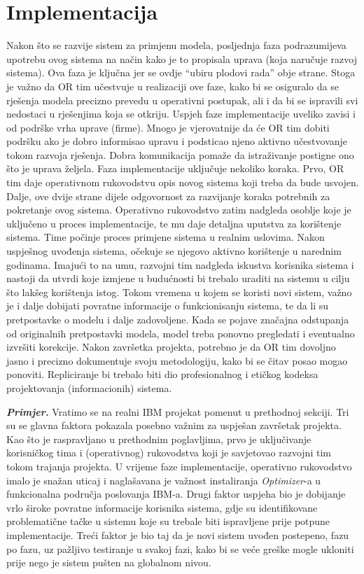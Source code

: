\documentclass[a4paper, utf8, 11pt, colorlinks]{book}
\begin{document}
\section{Implementacija}
Nakon što se razvije sistem za primjenu modela, posljednja faza  podrazumijeva upotrebu ovog sistema  na način kako je to propisala uprava (koja naručuje razvoj sistema). Ova faza je ključna jer se ovdje ``ubiru plodovi rada'' obje strane. Stoga je važno da OR tim  učestvuje u  realizaciji ove faze, kako bi se osiguralo da se rješenja modela precizno prevedu u operativni postupak, ali i da bi se ispravili svi nedostaci u rješenjima koja se otkriju. Uspjeh faze implementacije uveliko zavisi i od podrške vrha uprave (firme). Mnogo je vjerovatnije da će OR tim dobiti podršku ako je dobro informisao upravu i podsticao  njeno aktivno učestvovanje tokom razvoja rješenja. Dobra komunikacija pomaže da istraživanje postigne ono što je uprava željela.  Faza implementacije uključuje nekoliko koraka. Prvo, OR tim daje operativnom rukovodstvu opis novog sistema koji treba da bude usvojen. Dalje, ove dvije strane dijele odgovornost za razvijanje koraka potrebnih za pokretanje ovog sistema. Operativno rukovodstvo zatim nadgleda  osoblje koje je uključeno u proces implementacije, te mu daje detaljna uputstva za korištenje sistema. Time počinje proces primjene sistema u realnim uslovima. Nakon uspješnog uvođenja sistema, očekuje se njegovo aktivno korištenje u narednim godinama. Imajući to na umu, razvojni tim nadgleda iskustva korisnika sistema i nastoji da utvrdi koje izmjene u budućnosti bi trebalo uraditi na sistemu  u cilju što lakšeg korištenja istog.  Tokom vremena u kojem se koristi novi sistem, važno je i dalje dobijati povratne informacije o funkcionisanju sistema, te da li su pretpostavke o modelu i dalje zadovoljene. Kada se pojave značajna odstupanja od originalnih pretpostavki modela, model treba ponovno pregledati i eventualno izvršiti korekcije. Nakon završetka projekta, potrebno je da OR tim  dovoljno jasno i precizno dokumentuje svoju metodologiju, kako bi se čitav posao mogao ponoviti. Repliciranje bi trebalo
biti dio profesionalnog i etičkog kodeksa projektovanja (informacionih) sistema. %

\textbf{\emph{Primjer.}} Vratimo se na realni  IBM projekat pomenut u prethodnoj sekciji.  Tri su se glavna faktora pokazala posebno važnim za uspješan završetak projekta. Kao što je raspravljano u prethodnim poglavljima, 
prvo je   uključivanje korisničkog tima i (operativnog) rukovodstva koji je savjetovao razvojni tim tokom trajanja   projekta. U vrijeme faze implementacije, operativno rukovodstvo imalo je snažan  uticaj i naglašavana je važnost instaliranja \emph{Optimizer}-a u  funkcionalna područja poslovanja IBM-a. Drugi faktor uspjeha bio je dobijanje vrlo široke povratne informacije korisnika sistema, gdje su identifikovane problematične tačke u sistemu koje su  trebale biti ispravljene prije potpune implementacije. 
Treći faktor je bio taj da je novi sistem  uvođen postepeno, fazu po fazu, uz pažljivo testiranje u svakoj fazi, kako bi se veće greške mogle ukloniti prije nego   je sistem   pušten na  globalnom nivou.  
\vspace{0.5cm}
\end{document}
